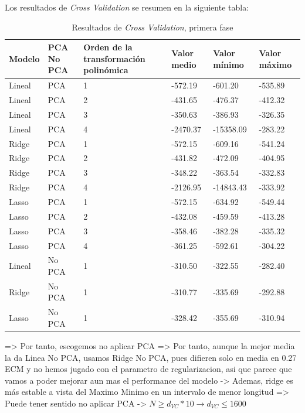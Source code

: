 \documentclass[11pt]{article}
\begin{document}
Los resultados de \emph{Cross Validation} se resumen en la siguiente tabla:

\begin{table}[H]
\begin{tabularx}{\textwidth}{|X|X|X|X|X|X|}
    \hline
    \textbf{Modelo} & \textbf{PCA \/ No PCA}& \textbf{Orden de la transformación polinómica} & \textbf{Valor medio} & \textbf{Valor mínimo} & \textbf{Valor máximo} \\
    \hline
    Lineal & PCA & 1 & -572.19 & -601.20 & -535.89 \\
    Lineal & PCA & 2 & -431.65 &-476.37 & -412.32 \\
    Lineal & PCA & 3 &-350.63 &-386.93 & -326.35 \\
    Lineal & PCA & 4 & -2470.37 &-15358.09 & -283.22 \\
    Ridge  & PCA & 1 &-572.15 &-609.16 & -541.24 \\
    Ridge  & PCA & 2 & -431.82 &-472.09 & -404.95 \\
    Ridge  & PCA & 3 & -348.22 &-363.54 & -332.83 \\
    Ridge  & PCA & 4 & -2126.95 &-14843.43 & -333.92 \\
    Lasso  & PCA & 1 & -572.15 &-634.92 & -549.44 \\
    Lasso  & PCA & 2 & -432.08 &-459.59 & -413.28 \\
    Lasso  & PCA & 3 & -358.46 &-382.28 & -335.32 \\
    Lasso  & PCA & 4 & -361.25 &-592.61 & -304.22 \\
    Lineal & No PCA & 1 & -310.50 &-322.55 & -282.40 \\
    Ridge  & No PCA & 1 & -310.77 &-335.69 & -292.88 \\
    Lasso  & No PCA & 1 & -328.42 &-355.69 & -310.94 \\
    \hline
\end{tabularx}
    \caption{Resultados de \emph{Cross Validation}, primera fase}
\end{table}

=> Por tanto, escogemos no aplicar PCA
=> Por tanto, aunque la mejor media la da Linea No PCA, usamos Ridge No PCA, pues difieren solo en media en 0.27 ECM y no hemos jugado con el parametro de regularizacion, asi que parece que vamos a poder mejorar aun mas el performance del modelo
    -> Ademas, ridge es más estable a vista del Maximo Minimo en un intervalo de menor longitud
=> Puede tener sentido no aplicar PCA -> $N \geq d_{VC} * 10 \rightarrow d_{VC} \leq 1600$
\end{document}
